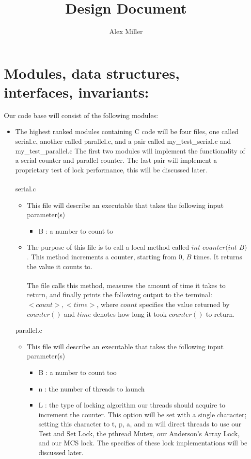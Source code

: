 \documentclass[]{article}
\title{Design Document}
\author{Alex Miller}
\begin{document}
	\maketitle
	
	
\section{Modules, data structures, interfaces, invariants:}
Our code base will consist of the following modules:
\begin{itemize}
	\item  The highest ranked modules containing C code will be four files, one called serial.c, another called parallel.c, and a pair called my\_test\_serial.c and my\_test\_parallel.c The first two modules will implement the functionality of a serial counter and parallel counter. The last pair will implement a proprietary test of lock performance, this will be discussed later.
	\\\\
	serial.c
	\begin{itemize}
		\item This file will describe an executable that takes the following input parameter(s)
		\begin{itemize}
			\item B : a number to count to
		\end{itemize}
		\item The purpose of this file is to call a local method called $int$  $counter(int$ $B)$. This method increments a counter, starting from 0, $B$ times. It returns the value it counts to. 
		\\\\
		The file calls this method, measures the amount of time it takes to return, and finally prints the following output to the terminal: $<count>,<time>$, where $count$ specifies the value returned by $counter()$ and $time$ denotes how long it took $counter()$ to return.
	\end{itemize}
	parallel.c
	\begin{itemize}
		\item This file will describe an executable that takes the following input parameter(s)
		\begin{itemize}
			\item B : a number to count too
			\item n : the number of threads to launch
			\item L : the type of locking algorithm our threads should acquire to increment the counter. This option will be set with a single character; setting this character to t, p, a, and m will direct threads  to use our Test and Set Lock, the pthread Mutex, our Anderson's Array Lock, and our MCS lock. The specifics of these lock implementations will be discussed later.

\end{itemize}
\end{itemize}
\end{itemize}
\end{document}
